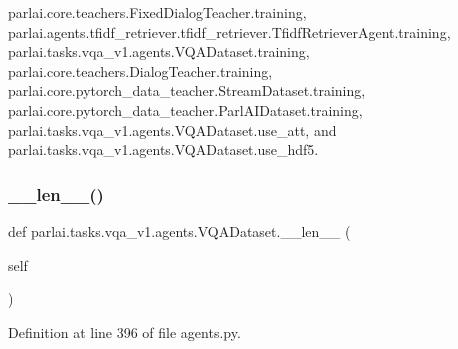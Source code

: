 parlai.\+core.\+teachers.\+Fixed\+Dialog\+Teacher.\+training, parlai.\+agents.\+tfidf\+\_\+retriever.\+tfidf\+\_\+retriever.\+Tfidf\+Retriever\+Agent.\+training, parlai.\+tasks.\+vqa\+\_\+v1.\+agents.\+V\+Q\+A\+Dataset.\+training, parlai.\+core.\+teachers.\+Dialog\+Teacher.\+training, parlai.\+core.\+pytorch\+\_\+data\+\_\+teacher.\+Stream\+Dataset.\+training, parlai.\+core.\+pytorch\+\_\+data\+\_\+teacher.\+Parl\+A\+I\+Dataset.\+training, parlai.\+tasks.\+vqa\+\_\+v1.\+agents.\+V\+Q\+A\+Dataset.\+use\+\_\+att, and parlai.\+tasks.\+vqa\+\_\+v1.\+agents.\+V\+Q\+A\+Dataset.\+use\+\_\+hdf5.

\mbox{\label{classparlai_1_1tasks_1_1vqa__v1_1_1agents_1_1VQADataset_af309d827a13fba8f616f8608821f5543}} 
\subsubsection{\texorpdfstring{\+\_\+\+\_\+len\+\_\+\+\_\+()}{\_\_len\_\_()}}
{\footnotesize\ttfamily def parlai.\+tasks.\+vqa\+\_\+v1.\+agents.\+V\+Q\+A\+Dataset.\+\_\+\+\_\+len\+\_\+\+\_\+ (\begin{DoxyParamCaption}\item[{}]{self }\end{DoxyParamCaption})}



Definition at line 396 of file agents.\+py.



